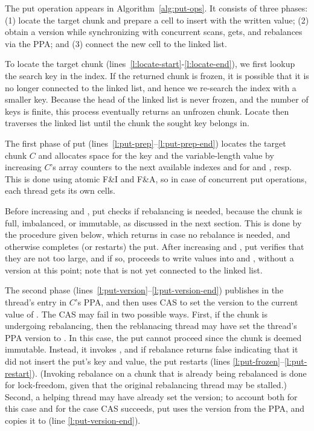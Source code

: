 The put operation appears in Algorithm~\ref{alg:put-ops}. It
consists of three phases: (1) locate the target chunk and
prepare a cell to insert with the written value; (2) obtain a version while synchronizing with
concurrent scans, gets, and rebalances via the PPA; and (3) connect  the new cell to the linked list.


To locate the target chunk (lines~\ref{l:locate-start}-\ref{l:locate-end}), we first lookup the search key in the index.
If the returned chunk is frozen, 
it is possible that it is no longer connected to the linked list, and hence we re-search the index with a smaller key. Because the head of the linked list is never frozen, 
and the number of keys is finite, this process eventually returns an unfrozen chunk. 
Locate then traverses the linked list until the chunk the sought key belongs in.

The first phase of put (lines~\ref{l:put-prep}--\ref{l:put-prep-end})
locates the target chunk $C$ and  allocates space for the key and the variable-length value 
by increasing $C$'s array  counters to the next available indexes  and  for  and , resp.
This is done using atomic F\&I and F\&A, so in case of concurrent put operations, each thread gets its own cells.

Before increasing  and , put checks if rebalancing is needed, because the chunk is full, imbalanced, or immutable, 
as discussed in the next section. This is done by the procedure  given below, 
which returns  in case no rebalance is needed, and otherwise completes (or restarts) the put.
After increasing  and , put verifies that they are not too large, 
and if so, proceeds to write values into  and , without a version at this point; note that  is not yet connected to the linked list.

The second phase (lines~\ref{l:put-version}--\ref{l:put-version-end}) publishes  in the thread's entry in $C$'s PPA,
and then uses CAS to set the version to the current value of .
The CAS may fail in two possible ways. First, if the chunk is undergoing rebalancing, then
the reblanacing thread may have set the thread's PPA version to .
In this case, the put cannot proceed since the chunk is deemed immutable. Instead, it invokes , 
and if rebalance returns false indicating that it did not insert the put's key and value, the put restarts
(lines \ref{l:put-frozen}--\ref{l:put-restart}).
(Invoking rebalance on a chunk that is already being rebalanced is done for lock-freedom, given that the original rebalancing thread
may be stalled.)
Second, a helping thread may have already set the version;
to account both for this case and for the case CAS succeeds,
put uses the version from the PPA, and copies it to  (line \ref{l:put-version-end}).


